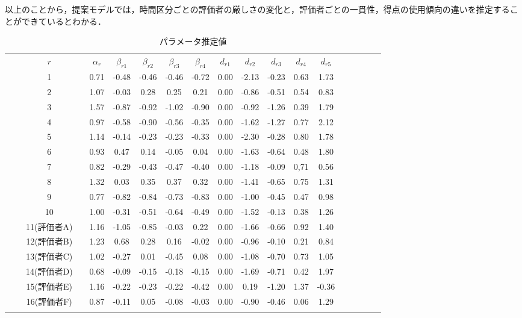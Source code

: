 \documentclass[a4paper,11pt,oneside,openany]{jsbook}
\newcommand{\bhline}[1]{\noalign{\hrule height #1}}
\begin{document}
以上のことから，提案モデルでは，時間区分ごとの評価者の厳しさの変化と，評価者ごとの一貫性，得点の使用傾向の違いを推定することができているとわかる．
\begin{table}[tb]
\begin{center}
\caption{パラメータ推定値}
\setlength{\tabcolsep}{5.pt}
\begin{tabular}{ccccccccccccccccccc}  
\bhline{1pt}
& & $r$ & & $\alpha_r$ & $\beta_{r1}$ & $\beta_{r2}$ & $\beta_{r3}$ &$\beta_{r4}$ & $d_{r1}$ &  $d_{r2}$ & $d_{r3}$ & $d_{r4}$ & $d_{r5}$  \\
\bhline{1pt}
 &  & 1  &  & 0.71 & -0.48  & -0.46 & -0.46 &-0.72 & 0.00  & -2.13 & -0.23 & 0.63 & 1.73\\
 &  & 2  &  & 1.07 & -0.03  & 0.28  & 0.25  & 0.21 & 0.00  & -0.86 & -0.51 & 0.54 & 0.83 \\
 &  & 3  &  & 1.57 & -0.87  & -0.92  & -1.02  & -0.90 & 0.00 & -0.92 & -1.26  & 0.39 & 1.79 \\
 &  & 4  &  & 0.97 & -0.58  & -0.90  & -0.56 & -0.35 & 0.00 & -1.62 & -1.27  & 0.77 & 2.12 \\
 &  & 5  &  & 1.14 & -0.14 & -0.23 & -0.23 & -0.33 & 0.00 & -2.30 & -0.28  & 0.80 & 1.78\\
 &  & 6  &  & 0.93 & 0.47 & 0.14 & -0.05 & 0.04 & 0.00 & -1.63 & -0.64  & 0.48 & 1.80\\
 &  & 7  &  & 0.82 & -0.29  & -0.43 & -0.47 & -0.40 & 0.00 & -1.18 & -0.09  & 0,71 & 0.56 \\
 &  & 8  &  & 1.32 & 0.03 & 0.35 & 0.37 & 0.32 & 0.00 & -1.41 & -0.65  & 0.75 & 1.31 \\
 &  & 9  &  & 0.77 & -0.82 & -0.84 & -0.73 & -0.83 & 0.00 & -1.00 & -0.45 & 0.47 & 0.98 \\
 &  & 10 &  & 1.00 & -0.31 & -0.51 & -0.64 & -0.49 & 0.00 & -1.52 & -0.13 & 0.38 & 1.26 \\
 &  & 11(評価者A) &  & 1.16 & -1.05 & -0.85 & -0.03 & 0.22 & 0.00 & -1.66 & -0.66 & 0.92 & 1.40 \\
 &  & 12(評価者B) &  & 1.23 & 0.68 & 0.28 & 0.16 & -0.02 & 0.00 & -0.96 & -0.10 & 0.21 & 0.84 \\
 &  & 13(評価者C) &  & 1.02 & -0.27 & 0.01 & -0.45 & 0.08 & 0.00 & -1.08 & -0.70 & 0.73 & 1.05\\
 &  & 14(評価者D) &  & 0.68 & -0.09  & -0.15 & -0.18 & -0.15 & 0.00 & -1.69 & -0.71 & 0.42 & 1.97 \\
 &  & 15(評価者E) &  & 1.16 & -0.22 & -0.23 & -0.22 & -0.42 & 0.00 & 0.19 & -1.20  & 1.37 & -0.36 \\
 &  & 16(評価者F) &  & 0.87 & -0.11 & 0.05 & -0.08 & -0.03 & 0.00 & -0.90 & -0.46 & 0.06 & 1.29 \\
\bhline{1pt}
\end{tabular}
\label{param}
\end{center}
\end{table}
\end{document}
